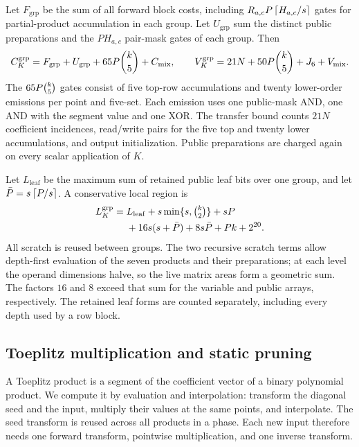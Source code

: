 \documentclass[b5paper, 10pt, abstract=true, captions=tableheading]{scrartcl}
\theoremstyle{plain}
\theoremstyle{definition}
\begin{document}
Let \(F_{\mathrm{grp}}\) be the sum of all forward block costs, including
\(R_{a,c}P\left\lceil H_{a,c}/s\right\rceil\) gates for partial-product accumulation in
each group. Let \(U_{\mathrm{grp}}\) sum the distinct public preparations
and the \(PH_{a,c}\) pair-mask gates of each group. Then
\begin{equation}
 C_K^{\mathrm{grp}}=F_{\mathrm{grp}}+U_{\mathrm{grp}}+65P\binom{k}{5}+C_{\mathrm{mix}},
 \qquad
 V_K^{\mathrm{grp}}=21N+50P\binom{k}{5}+J_6+V_{\mathrm{mix}}.
 \label{eq:wopt-groupedK}
\end{equation}
The \(65P\binom{k}{5}\) gates consist of five top-row accumulations and
twenty lower-order emissions per point and five-set. Each emission uses
one public-mask AND, one AND with the segment value and one XOR.
The transfer bound counts \(21N\) coefficient incidences, read/write pairs
for the five top and twenty lower accumulations, and output initialization. Public preparations are charged
again on every scalar application of \(K\).

Let \(L_{\mathrm{leaf}}\) be the maximum sum of retained public leaf bits
over one group, and let \(\bar P=s\left\lceil P/s\right\rceil\). A conservative local
region is
\begin{equation}
 \begin{split}
 L_K^{\mathrm{grp}}={}&L_{\mathrm{leaf}}
 +s\min\{s,\tbinom{k}{2}\}+sP\\
 &+16s(s+\bar P)+8s\bar P+Pk+2^{20}.
 \end{split}
 \label{eq:wopt-groupcache}
\end{equation}
All scratch is reused between groups. The two recursive scratch terms
allow depth-first evaluation of the seven products and their preparations;
at each level the operand dimensions halve, so the live matrix areas form
a geometric sum. The factors $16$ and $8$ exceed that sum for the variable
and public arrays, respectively. The retained leaf forms are counted
separately, including every depth used by a row block.

\subsection{Toeplitz multiplication and static pruning}
\label{sec:wopt-fft}
A Toeplitz product is a segment of the coefficient vector of a binary
polynomial product. We compute it by evaluation and interpolation:
transform the diagonal seed and the input, multiply their values at the
same points, and interpolate. The seed transform is reused across all
products in a phase. Each new input therefore needs one forward transform,
pointwise multiplication, and one inverse transform.
\end{document}
